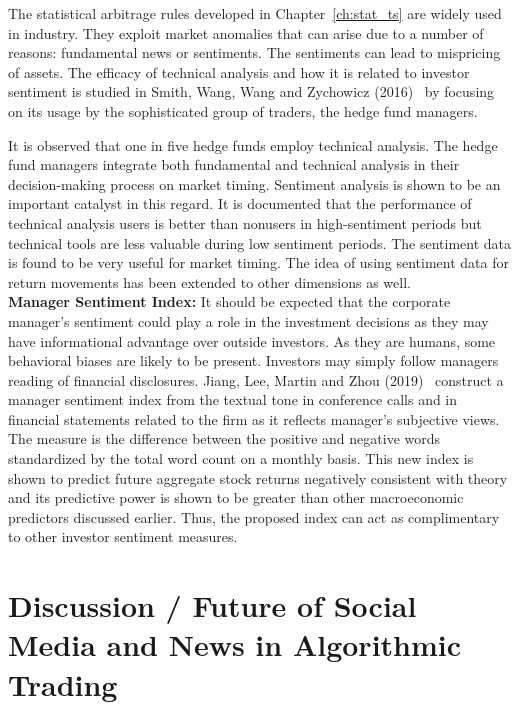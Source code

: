 The statistical arbitrage rules developed in Chapter~\ref{ch:stat_ts} are widely used in industry. They exploit market anomalies that can arise due to a number of reasons: fundamental news or sentiments. The sentiments can lead to mispricing of assets. The efficacy of technical analysis and how it is related to investor sentiment is studied in Smith, Wang, Wang and Zychowicz (2016)~\cite{smithwangwangzy16} by focusing on its usage by the sophisticated group of traders, the hedge fund managers. 


It is observed that one in five hedge funds employ technical analysis. The hedge fund managers integrate both fundamental and technical analysis in their decision-making process on market timing. Sentiment analysis is shown to be an important catalyst in this regard. It is documented that the performance of technical analysis users is better than nonusers in high-sentiment periods but technical tools are less valuable during low sentiment periods. The sentiment data is found to be very useful for market timing. The idea of using sentiment data for return movements has been extended to other dimensions as well. \\


\noindent\textbf{Manager Sentiment Index:} It should be expected that the corporate manager's sentiment could play a role in the investment decisions as they may have informational advantage over outside investors. As they are humans, some behavioral biases are likely to be present. Investors may simply follow managers reading of financial disclosures. Jiang, Lee, Martin and Zhou (2019)~\cite{jianleemartin} construct a manager sentiment index from the textual tone in conference calls and in financial statements related to the firm as it reflects manager's subjective views. The measure is the difference between the positive and negative words standardized by the total word count on a monthly basis. This new index is shown to predict future aggregate stock returns negatively consistent with theory and its predictive power is shown to be greater than other macroeconomic predictors discussed earlier. Thus, the proposed index can act as complimentary to other investor sentiment measures. 



\section{Discussion / Future of Social Media and News in Algorithmic Trading}


